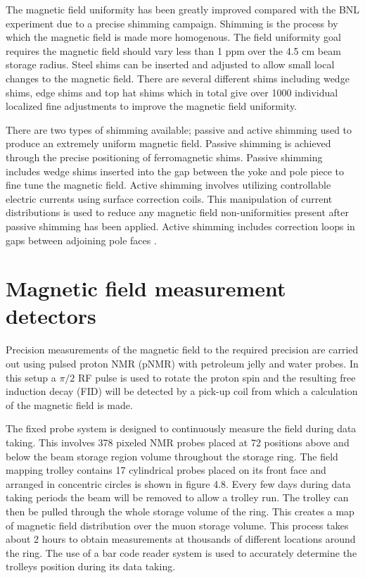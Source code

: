 The magnetic field uniformity has been greatly improved compared with the BNL experiment due to a precise shimming campaign. Shimming is the process by which the magnetic field is made more homogenous. The field uniformity goal requires the magnetic field should vary less than 1 ppm over the 4.5 cm beam storage radius. Steel shims can be inserted and adjusted to allow small local changes to the magnetic field. There are several different shims including wedge shims, edge shims and top hat shims which in total give over 1000 individual localized fine adjustments to improve the magnetic field uniformity.

There are two types of shimming available; passive and active shimming used to produce an extremely uniform magnetic field. Passive shimming is achieved through the precise positioning of ferromagnetic shims. Passive shimming includes wedge shims inserted into the gap between the yoke and pole piece to fine tune the magnetic field. Active shimming involves utilizing controllable electric currents using surface correction coils. This manipulation of current distributions is used to reduce any magnetic field non-uniformities present after passive shimming has been applied. Active shimming includes correction loops in gaps between adjoining pole faces \cite{magref4}\cite{Reference27}.

\section{Magnetic field measurement detectors}

Precision measurements of the magnetic field to the required precision are carried out using pulsed proton NMR (pNMR) with petroleum jelly and water probes. In this setup a $\pi/2$ RF pulse is used to rotate the proton spin and the resulting free induction decay (FID) will be detected by a pick-up coil from which a calculation of the magnetic field is made.

The fixed probe system is designed to continuously measure the field during data taking. This involves 378 pixeled NMR probes placed at 72 positions above and below the beam storage region volume throughout the storage ring. The field mapping trolley contains 17 cylindrical probes placed on its front face and arranged in concentric circles is shown in figure 4.8. Every few days during data taking periods the beam will be removed to allow a trolley run. The trolley can then be pulled through the whole storage volume of the ring. This creates a map of magnetic field distribution over the muon storage volume. This process takes about 2 hours to obtain measurements at thousands of different locations around the ring. The use of a bar code reader system is used to accurately determine the trolleys position during its data taking.   

